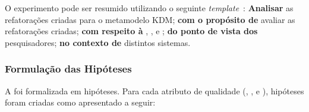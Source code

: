 O experimento pode ser resumido utilizando o seguinte \textit{template}~\cite{Wohlin}: \textbf{Analisar} as refatorações criadas para o metamodelo KDM; \textbf{com o propósito de} avaliar as refatorações criadas; \textbf{com respeito à} , ,  e ; \textbf{do ponto de vista dos} pesquisadores; \textbf{no contexto de} distintos sistemas.

\subsubsection{Formulação das Hipóteses}



A  foi formalizada em hipóteses. Para cada atributo de qualidade (, ,  e ), hipóteses foram criadas como apresentado a seguir:


